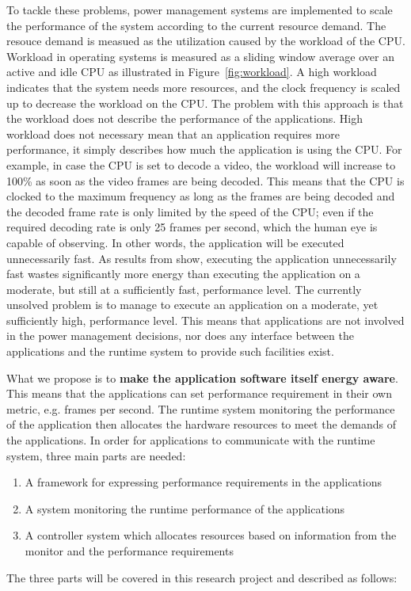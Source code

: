 \documentclass{article}
\begin{document}
To tackle these problems, power management systems are implemented to scale the performance of the system according to the current resource demand. 
The resouce demand is measued as the utilization caused by the workload of the CPU. 
Workload in operating systems is measured as a sliding window average over an active and idle CPU as illustrated in Figure~\ref{fig:workload}. 
A high workload indicates that the system needs more resources, and the clock frequency is scaled up to decrease the workload on the CPU.
The problem with this approach is that the workload does not describe the performance of the applications.
High workload does not necessary mean that an application requires more performance, it simply describes how much the application is using the CPU.
For example, in case the CPU is set to decode a video, the workload will increase to 100\% as soon as the video frames are being decoded.  
This means that the CPU is clocked to the maximum frequency as long as the frames are being decoded and the decoded frame rate is only limited by the speed of the CPU; 
even if the required decoding rate is only 25 frames per second, which the human eye is capable of observing.
In other words, the application will be executed unnecessarily fast. 
As results from \cite{HolmbackaHipeac, HolmbackaDasip} show, executing the application unnecessarily fast wastes significantly more energy than executing the application on a moderate, 
but still at a sufficiently fast, performance level. 
The currently unsolved problem is to manage to execute an application on a moderate, yet sufficiently high, performance level. 
This means that applications are not involved in the power management decisions, nor does any interface between the applications and the runtime system to provide such facilities exist. 



What we propose is to \textbf{make the application software itself energy aware}.
This means that the applications can set performance requirement in their own metric, e.g. frames per second.
The runtime system monitoring the performance of the application then allocates the hardware resources to meet the demands of the applications.
In order for applications to communicate with the runtime system, three main parts are needed:
\begin{enumerate}
 \item A framework for expressing performance requirements in the applications
 \item A system monitoring the runtime performance of the applications
 \item A controller system which allocates resources based on information from the monitor and the performance requirements
\end{enumerate}
The three parts will be covered in this research project and described as follows:
\end{document}
